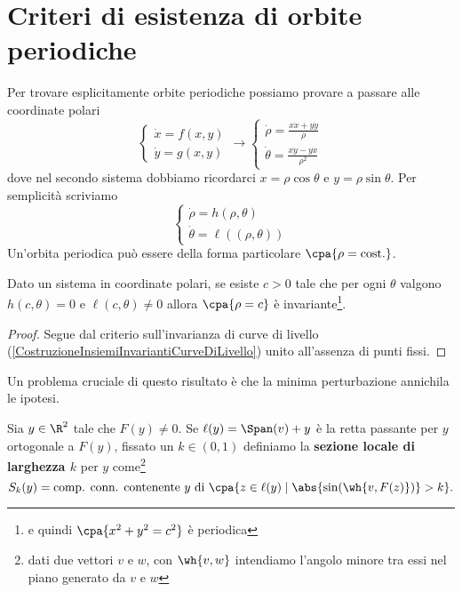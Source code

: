 \section{Criteri di esistenza di orbite periodiche}
Per trovare esplicitamente orbite periodiche possiamo provare a passare alle coordinate polari
\[\begin{cases}
\dot x=f(x,y)\\
\dot y=g(x,y)
\end{cases} \longrightarrow \begin{cases}
\displaystyle\dot \rho =\frac{x\dot x+y\dot y}{\rho}\\
\displaystyle\dot\theta=\frac{x\dot y-y\dot x}{\rho^2}
\end{cases}\]
dove nel secondo sistema dobbiamo ricordarci $x=\rho\cos\theta$ e $y=\rho\sin\theta$. Per semplicit\`a scriviamo
\[\begin{cases}
\dot \rho=h(\rho,\theta)\\
\dot \theta=\ell((\rho,\theta))
\end{cases}\]
Un'orbita periodica pu\`o essere della forma particolare $\cpa{\rho=\text{cost.}}$.
\begin{proposition}\label{CriterioPolareEsistenzaOrbitaPeriodica}
Dato un sistema in coordinate polari, se esiste $c>0$ tale che per ogni $\theta$ valgono $h(c,\theta)=0$ e $\ell(c,\theta)\neq0$ allora $\cpa{\rho=c}$ \`e invariante\footnote{e quindi $\cpa{x^2+y^2=c^2}$ \`e periodica}.
\end{proposition}
\begin{proof}
Segue dal criterio sull'invarianza di curve di livello (\ref{CostruzioneInsiemiInvariantiCurveDiLivello}) unito all'assenza di punti fissi.
\end{proof}
\noindent Un problema cruciale di questo risultato \`e che la minima perturbazione annichila le ipotesi.

\begin{definition}
Sia $y\in \R^2$ tale che $F(y)\neq 0$. Se $\ell(y)=\Span(v)+y$ \`e la retta passante per $y$ ortogonale a $F(y)$, fissato un $k\in (0,1)$ definiamo la \textbf{sezione locale di larghezza $k$} per $y$ come\footnote{dati due vettori $v$ e $w$, con $\wh{v,w}$ intendiamo l'angolo minore tra essi nel piano generato da $v$ e $w$}
\[S_k(y)=\text{comp. conn. contenente $y$ di }\cpa{z\in \ell(y)\mid \abs{\sin(\wh{v,F(z)})}>k}.\]
\end{definition}

